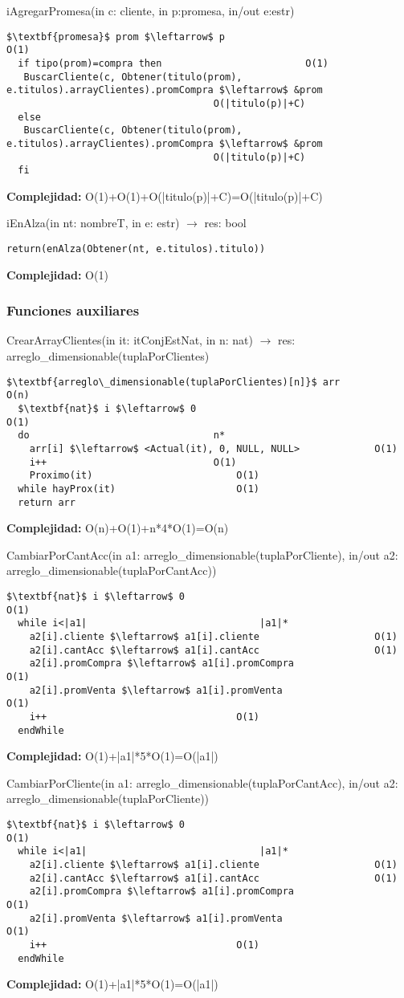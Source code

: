 iAgregarPromesa(in c: cliente, in p:promesa, in/out e:estr)
\begin{lstlisting}[mathescape]
  $\textbf{promesa}$ prom $\leftarrow$ p									O(1)
  if tipo(prom)=compra then							O(1)
   BuscarCliente(c, Obtener(titulo(prom), e.titulos).arrayClientes).promCompra $\leftarrow$ &prom
   									O(|titulo(p)|+C)
  else
   BuscarCliente(c, Obtener(titulo(prom), e.titulos).arrayClientes).promCompra $\leftarrow$ &prom
   									O(|titulo(p)|+C)
  fi
\end{lstlisting}
\textbf{Complejidad:} O(1)+O(1)+O(|titulo(p)|+C)=O(|titulo(p)|+C)

iEnAlza(in nt: nombreT, in e: estr) $\rightarrow$ res: bool
\begin{lstlisting}[mathescape]
  return(enAlza(Obtener(nt, e.titulos).titulo))
\end{lstlisting}
\textbf{Complejidad:} O(1)



\subsubsection{Funciones auxiliares}
CrearArrayClientes(in it: itConjEstNat, in n: nat) $\rightarrow$ res: arreglo\_dimensionable(tuplaPorClientes)
\begin{lstlisting}[mathescape]
  $\textbf{arreglo\_dimensionable(tuplaPorClientes)[n]}$ arr					O(n)
  $\textbf{nat}$ i $\leftarrow$ 0									O(1)
  do								n*
    arr[i] $\leftarrow$ <Actual(it), 0, NULL, NULL>				O(1)
    i++								O(1)
    Proximo(it)							O(1)
  while hayProx(it)						O(1)
  return arr
\end{lstlisting}
\textbf{Complejidad:} O(n)+O(1)+n*4*O(1)=O(n)

CambiarPorCantAcc(in a1: arreglo\_dimensionable(tuplaPorCliente), in/out a2: arreglo\_dimensionable(tuplaPorCantAcc))
\begin{lstlisting}[mathescape]
  $\textbf{nat}$ i $\leftarrow$ 0										O(1)
  while i<|a1|								|a1|*
    a2[i].cliente $\leftarrow$ a1[i].cliente					O(1)
    a2[i].cantAcc $\leftarrow$ a1[i].cantAcc					O(1)
    a2[i].promCompra $\leftarrow$ a1[i].promCompra					O(1)
    a2[i].promVenta $\leftarrow$ a1[i].promVenta					O(1)
    i++									O(1)
  endWhile
\end{lstlisting}
\textbf{Complejidad:} O(1)+|a1|*5*O(1)=O(|a1|)

CambiarPorCliente(in a1: arreglo\_dimensionable(tuplaPorCantAcc), in/out a2: arreglo\_dimensionable(tuplaPorCliente))
\begin{lstlisting}[mathescape]
  $\textbf{nat}$ i $\leftarrow$ 0										O(1)
  while i<|a1|								|a1|*
    a2[i].cliente $\leftarrow$ a1[i].cliente					O(1)
    a2[i].cantAcc $\leftarrow$ a1[i].cantAcc					O(1)
    a2[i].promCompra $\leftarrow$ a1[i].promCompra					O(1)
    a2[i].promVenta $\leftarrow$ a1[i].promVenta					O(1)
    i++									O(1)
  endWhile
\end{lstlisting}
\textbf{Complejidad:} O(1)+|a1|*5*O(1)=O(|a1|)

